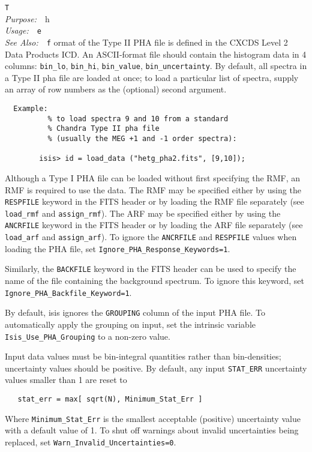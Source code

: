 \documentclass{book}
\makeatletter
\newif\ifpdf
\newenvironment{isisfunction}[4]%
{\index{{#1}@{\tt #1}}%
  \ifpdf
  \else
     \addcontentsline{toc}{subsection}{{#1} -- {#2}}
  \fi
  \vbox{
          \vspace*{\baselineskip}
          {\LARGE\tt #1}\vspace*{\baselineskip}\\
          {{\it Purpose:}~~{#2}}\\
          {{\it Usage:}~~{\tt #3}}\\
          {{\it See Also:}~~{\tt #4}}
       }
}%
{ }
\makeatother
\begin{document}
{\begin{isisfunction}
The format of the Type II PHA file is defined in the CXCDS Level 2
Data Products ICD. An ASCII-format file should contain the histogram
data in 4 columns: {\tt bin\_lo}, {\tt bin\_hi}, {\tt bin\_value},
{\tt bin\_uncertainty}.  By default, all spectra in a Type II pha file
are loaded at once; to load a particular list of spectra, supply an
array of row numbers as the (optional) second argument.

\begin{verbatim}
  Example:
          % to load spectra 9 and 10 from a standard
          % Chandra Type II pha file
          % (usually the MEG +1 and -1 order spectra):

        isis> id = load_data ("hetg_pha2.fits", [9,10]);
\end{verbatim}

Although a Type I PHA file can be loaded without first
specifying the RMF, an RMF is required to use the data.  The
RMF may be specified either by using the {\tt RESPFILE} keyword
in the FITS header or by loading the RMF file separately (see
{\tt load\_rmf} and {\tt assign\_rmf}). The ARF may be
specified either by using the {\tt ANCRFILE} keyword in the
FITS header or by loading the ARF file separately (see {\tt
load\_arf} and {\tt assign\_arf}).  To ignore the
\verb|ANCRFILE| and \verb|RESPFILE| values when loading
the PHA file, set \verb|Ignore_PHA_Response_Keywords=1|.


Similarly, the {\tt BACKFILE} keyword in the FITS header
can be used to specify the name of the file containing
the background spectrum.  To ignore this keyword,
set \verb|Ignore_PHA_Backfile_Keyword=1|.


By default, isis ignores the \verb|GROUPING| column of the
input PHA file.  To automatically apply the grouping on input,
set the intrinsic variable \verb|Isis_Use_PHA_Grouping| to a
non-zero value.

Input data values must be bin-integral quantities rather than
bin-densities; uncertainty values should be positive.  By default, any
input {\tt STAT\_ERR} uncertainty values smaller than 1 are reset to
\begin{verbatim}
   stat_err = max[ sqrt(N), Minimum_Stat_Err ]
\end{verbatim}
Where \verb|Minimum_Stat_Err| is the smallest acceptable
(positive) uncertainty value with a default value of 1.
To shut off warnings about invalid uncertainties being
replaced, set \verb|Warn_Invalid_Uncertainties=0|.


\end{isisfunction}}
\end{document}
